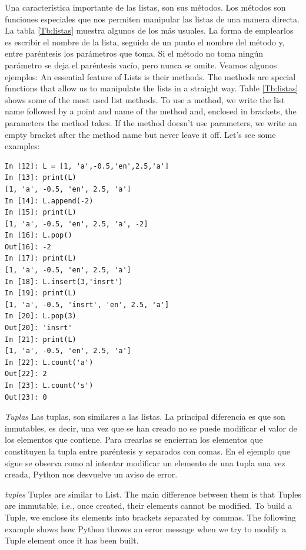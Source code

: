 \begin{paracol}{2}
Una característica importante de las listas, son sus métodos. Los métodos son funciones especiales que nos permiten manipular las listas de una manera directa. La tabla \ref{Tb:listas} muestra algunos de los más usuales. La forma de emplearlos es escribir el nombre de la lista, seguido de un punto el nombre del método y, entre paréntesis los parámetros que toma. Si el método no toma ningún parámetro se deja el paréntesis vacío, pero nunca se omite. Veamos algunos ejemplos:
\switchcolumn
An essential feature of Lists is their methods. The methods are special functions that allow us to manipulate the lists in a straight way. Table \ref{Tb:listas} shows some of the most used list methods. To use a method, we write the list name followed by a point and name of the method and, enclosed in brackets, the parameters the method takes. If the method doesn't use parameters, we write an empty bracket after the method name but never leave it off. Let's see some examples:
\end{paracol}

\begin{center}
    \begin{minipage}{0.5\textwidth}
\begin{verbatim}
In [12]: L = [1, 'a',-0.5,'en',2.5,'a']
In [13]: print(L)
[1, 'a', -0.5, 'en', 2.5, 'a']
In [14]: L.append(-2)
In [15]: print(L)
[1, 'a', -0.5, 'en', 2.5, 'a', -2]
In [16]: L.pop()
Out[16]: -2
In [17]: print(L)
[1, 'a', -0.5, 'en', 2.5, 'a']
In [18]: L.insert(3,'insrt')
In [19]: print(L)
[1, 'a', -0.5, 'insrt', 'en', 2.5, 'a']
In [20]: L.pop(3)
Out[20]: 'insrt'
In [21]: print(L)
[1, 'a', -0.5, 'en', 2.5, 'a']
In [22]: L.count('a')
Out[22]: 2
In [23]: L.count('s')
Out[23]: 0
\end{verbatim}
    \end{minipage}
\end{center}

\begin{paracol}{2}

\emph{Tuplas} Las tuplas, son similares a las listas. La principal diferencia es que son inmutables, es decir, una vez que se han creado no se puede modificar el valor de los elementos que contiene. Para crearlas se encierran los elementos que constituyen la tupla entre paréntesis y separados con comas. En el ejemplo que sigue se observa como al intentar modificar un elemento de una tupla una vez creada, Python nos desvuelve un aviso de error.
\switchcolumn

\emph{tuples} Tuples are similar to List. The main difference between them is that Tuples are immutable, i.e., once created, their elements cannot be modified. To build a Tuple, we enclose its elements into brackets separated by commas. The following example shows how Python throws an error message when we try to modify a Tuple element once it has been built.
\end{paracol}

